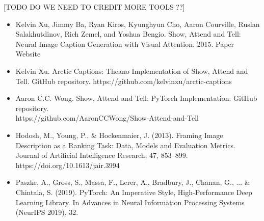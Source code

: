 \documentclass{article}
\begin{document}
[TODO DO WE NEED TO CREDIT MORE TOOLS ??]
\begin{itemize}
    \item Kelvin Xu, Jimmy Ba, Ryan Kiros, Kyunghyun Cho, Aaron Courville, Ruslan Salakhutdinov, Rich Zemel, and Yoshua Bengio. Show, Attend and Tell: Neural Image Caption Generation with Visual Attention. 2015. Paper Website
    \item Kelvin Xu. Arctic Captions: Theano Implementation of Show, Attend and Tell. GitHub repository. https://github.com/kelvinxu/arctic-captions 
    \item Aaron C.C. Wong. Show, Attend and Tell: PyTorch Implementation. GitHub repository. \\ https://github.com/AaronCCWong/Show-Attend-and-Tell
    \item Hodosh, M., Young, P., \& Hockenmaier, J. (2013). Framing Image Description as a Ranking Task: Data, Models and Evaluation Metrics. Journal of Artificial Intelligence Research, 47, 853–899.\\ https://doi.org/10.1613/jair.3994
    \item Paszke, A., Gross, S., Massa, F., Lerer, A., Bradbury, J., Chanan, G., ... \& Chintala, S. (2019). PyTorch: An Imperative Style, High-Performance Deep Learning Library. In Advances in Neural Information Processing Systems (NeurIPS 2019), 32.
\end{itemize}
\end{document}
